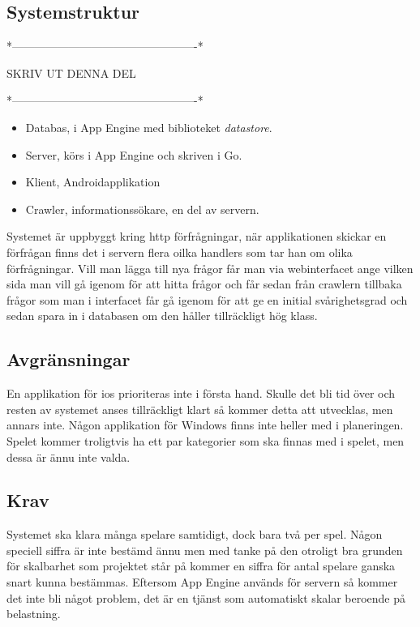 \documentclass[swedish,12pt,a4paper]{article}
\begin{document}
\subsection{Systemstruktur}

\begin{figure}[hb]
\centering

\end{figure} 



*-------------------------------------------------*


                 SKRIV UT DENNA DEL


*-------------------------------------------------*
\begin{itemize}
\item Databas, i App Engine med biblioteket \textit{datastore}.
\item Server, körs i App Engine och skriven i Go.
\item Klient, Androidapplikation
\item Crawler, informationssökare, en del av servern.
\end{itemize}

Systemet är uppbyggt kring http förfrågningar, när applikationen skickar en förfrågan finns det i servern flera oilka handlers som tar han om olika förfrågningar. Vill man lägga till nya frågor får man via webinterfacet ange vilken sida man vill gå igenom för att hitta frågor och får sedan från crawlern tillbaka frågor som man i interfacet får gå igenom för att ge en initial svårighetsgrad och sedan spara in i databasen om den håller tillräckligt hög klass.



\subsection{Avgränsningar}
En applikation för ios prioriteras inte i första hand. Skulle det bli tid över och resten av systemet anses tillräckligt klart så kommer detta att utvecklas, men annars inte. Någon applikation för Windows finns inte heller med i planeringen. Spelet kommer troligtvis ha ett par kategorier som ska finnas med i spelet, men dessa är ännu inte valda.

\subsection{Krav}
Systemet ska klara många spelare samtidigt, dock bara två per spel. Någon speciell siffra är inte bestämd ännu men med tanke på den otroligt bra grunden för skalbarhet som projektet står på kommer en siffra för antal spelare ganska snart kunna bestämmas. Eftersom App Engine används för servern så kommer det inte bli något problem, det är en tjänst som automatiskt skalar beroende på belastning.
\end{document}
